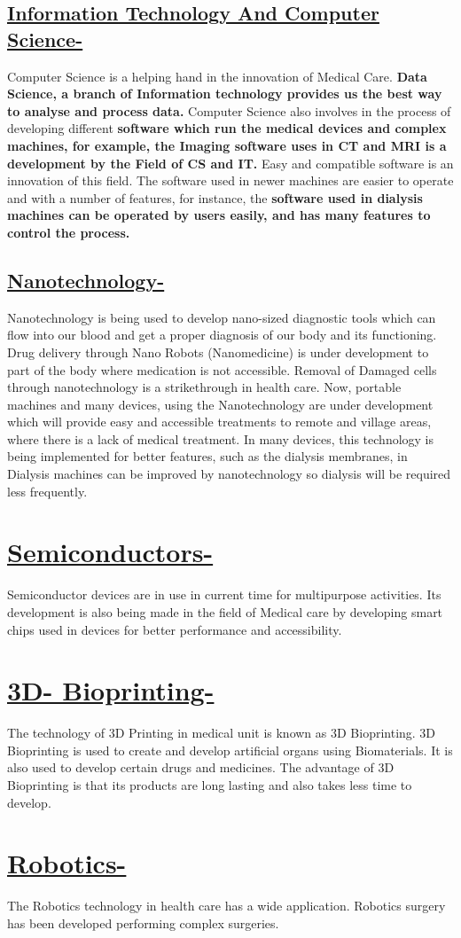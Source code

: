 \documentclass[18pt]{article}
\begin{document}
\subsection{\underline{Information Technology And Computer Science-}}
Computer Science is a helping hand in the innovation of Medical Care. \textbf {Data Science, a branch of Information technology provides us the best way to analyse and process data.}
\newline Computer Science also involves in the process of developing different \textbf{software which run the medical devices and complex machines, for example, the Imaging software uses in CT and MRI is a development by the Field of CS and IT.}
\newline Easy and compatible software is an innovation of this field. The software used in newer machines are easier to operate and with a number of features, for instance, the \textbf{software used in dialysis machines can be operated by users easily, and has many features to control the process.}
\subsection{\underline{Nanotechnology-}}
Nanotechnology is being used to develop nano-sized diagnostic tools which can flow into our blood and get a proper diagnosis of our body and its functioning. Drug delivery through Nano Robots (Nanomedicine) is under development to part of the body where medication is not accessible. Removal of Damaged cells through nanotechnology is a strikethrough in health care. Now, portable machines and many devices, using the Nanotechnology are under development which will provide easy and accessible treatments to remote and village areas, where there is a lack of medical treatment. In many devices, this technology is being implemented for better features, such as the dialysis membranes, in Dialysis machines  can be improved by nanotechnology so dialysis will be required less frequently.

\section{\underline{ Semiconductors-}}
Semiconductor devices are in use in current time for multipurpose activities. Its development is also being made in the field of Medical care by developing smart chips used in devices for better performance and accessibility.
\section{\underline{3D- Bioprinting-}}
The technology of 3D Printing in medical unit is known as 3D Bioprinting. 3D Bioprinting is used to create and develop artificial organs using Biomaterials. It is also used to develop certain drugs and medicines. The advantage of 3D Bioprinting is that its products are long lasting and also takes less time to develop.
\section{\underline{Robotics-}}
The Robotics technology in health care has a wide application. Robotics surgery has been developed performing complex surgeries. 
\end{document}

